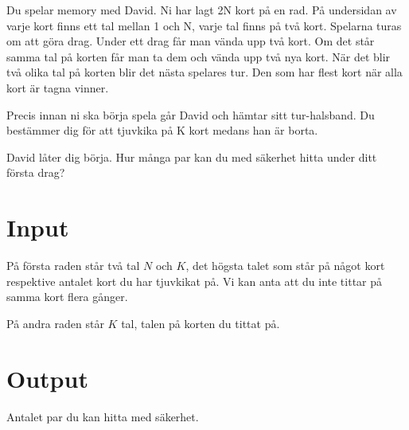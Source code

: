 Du spelar memory med David. Ni har lagt 2N kort på en rad. På undersidan av varje kort finns ett tal mellan 1 och N, varje tal finns på två kort. Spelarna turas om att göra drag. Under ett drag får man vända upp två kort. Om det står samma tal på korten får man ta dem och vända upp två nya kort. När det blir två olika tal på korten blir det nästa spelares tur. Den som har flest kort när alla kort är tagna vinner.

Precis innan ni ska börja spela går David och hämtar sitt tur-halsband. Du bestämmer dig för att tjuvkika på K kort medans han är borta.

David låter dig börja. Hur många par kan du med säkerhet hitta under ditt första drag?

\section*{Input}

På första raden står två tal $N$ och $K$, det högsta talet som står på något kort respektive antalet kort du har tjuvkikat på. Vi kan anta att du inte tittar på samma kort flera gånger.

På andra raden står $K$ tal, talen på korten du tittat på.

\section*{Output}

Antalet par du kan hitta med säkerhet. 